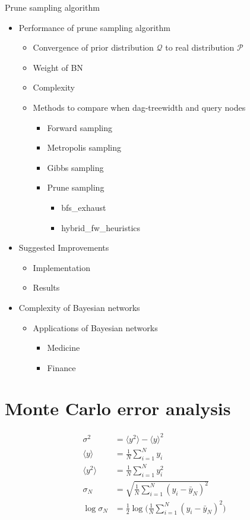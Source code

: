 \documentclass{amsart}
\theoremstyle{plain}
\theoremstyle{remark}
\theoremstyle{plain}
\newcommand{\Q}{{\mathcal{Q}}}
\newcommand{\calP}{{\mathcal{P}}}
\begin{document}
Prune sampling algorithm
\begin{itemize}
\item Performance of prune sampling algorithm 
\begin{itemize}
\item Convergence of prior distribution $\Q$ to real distribution $\calP$
\item Weight of BN
\item Complexity
\item Methods to compare when dag-treewidth and query nodes
\begin{itemize}
\item Forward sampling
\item Metropolis sampling
\item Gibbs sampling
\item Prune sampling
\begin{itemize}
\item bfs\_exhaust
\item hybrid\_fw\_heuristics
\end{itemize}
\end{itemize}
\end{itemize}
\item Suggested Improvements
\begin{itemize}
\item Implementation 
\item Results
\end{itemize}
\item Complexity of Bayesian networks
\begin{itemize}
\item Applications of Bayesian networks
\begin{itemize}
\item Medicine
\item Finance
\end{itemize}
\end{itemize}
\end{itemize}

\newpage

\section{Monte Carlo error analysis}

\begin{align*}
\sigma^2 &= \langle y^2 \rangle - \langle y \rangle ^2 \\
\langle y \rangle &= \frac{1}{N} \sum_{i=1}^N y_i \\
\langle y^2 \rangle &= \frac{1}{N} \sum_{i=1}^N y_i^2 \\
\sigma_N &= \sqrt{ \frac{1}{N} \sum_{i=1}^N ( y_i - \bar{y}_N )^2 } \\
\log \sigma_N &= \frac{1}{2} \log \big( \frac{1}{N} \sum_{i=1}^N ( y_i - \bar{y}_N )^2 \big)
 \end{align*} \vspace{3pc}
 
\end{document}
